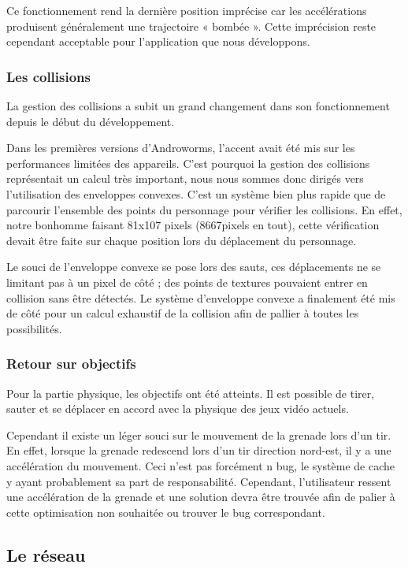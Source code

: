 \documentclass{report}
\begin{document}
Ce fonctionnement rend la dernière position imprécise car les 
accélérations produisent généralement une trajectoire « bombée ». Cette 
imprécision reste cependant acceptable pour l’application que nous 
développons.

\subsubsection{Les collisions}
La gestion des collisions a subit un grand changement dans son 
fonctionnement depuis le début du développement.

Dans les premières versions d’Androworms, l’accent avait été mis sur les
performances limitées des appareils. C’est pourquoi la gestion des
collisions représentait un calcul très important, nous nous sommes donc
dirigés vers l’utilisation des enveloppes convexes. C’est un système
bien plus rapide que de parcourir l’ensemble des points du personnage
pour vérifier les collisions. En effet, notre bonhomme faisant 81x107
pixels (8667pixels en tout), cette vérification devait être faite sur
chaque position lors du déplacement du personnage. 

Le souci de l’enveloppe convexe se pose lors des sauts, ces déplacements
ne se limitant pas à un pixel de côté ; des points de textures pouvaient
entrer en collision sans être détectés. 
Le système d’enveloppe convexe a finalement été mis de côté pour un
calcul exhaustif de la collision afin de pallier à toutes les
possibilités.

\subsubsection{Retour sur objectifs}

Pour la partie physique, les objectifs ont été atteints. Il est possible
de tirer, sauter et se déplacer en accord avec la physique des jeux
vidéo actuels. 

Cependant il existe un léger souci sur le mouvement de la grenade lors
d’un tir. En effet, lorsque la grenade redescend lors d’un tir direction
nord-est, il y a une accélération du mouvement. Ceci n’est pas forcément
n bug, le système de cache y ayant probablement sa part de
responsabilité. Cependant, l’utilisateur ressent une accélération de la
grenade et une solution devra être trouvée afin de palier à cette
optimisation non souhaitée ou trouver le bug correspondant.


\subsection{Le réseau}
\bigskip
\end{document}
